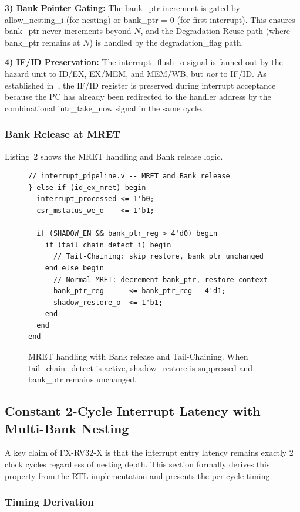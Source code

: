 \documentclass[letterpaper,journal]{IEEEtran}
\begin{document}
\textbf{3) Bank Pointer Gating:} The bank\_ptr increment is gated by allow\_nesting\_i (for nesting) or bank\_ptr = 0 (for first interrupt). This ensures bank\_ptr never increments beyond $N$, and the Degradation Reuse path (where bank\_ptr remains at $N$) is handled by the degradation\_flag path.

\textbf{4) IF/ID Preservation:} The interrupt\_flush\_o signal is fanned out by the hazard unit to ID/EX, EX/MEM, and MEM/WB, but \emph{not} to IF/ID. As established in~\cite{ref1}, the IF/ID register is preserved during interrupt acceptance because the PC has already been redirected to the handler address by the combinational intr\_take\_now signal in the same cycle.

\subsubsection{Bank Release at MRET}

Listing~2 shows the MRET handling and Bank release logic.

\begin{figure}[!t]
\centering
\begin{verbatim}
// interrupt_pipeline.v -- MRET and Bank release
} else if (id_ex_mret) begin
  interrupt_processed <= 1'b0;
  csr_mstatus_we_o    <= 1'b1;

  if (SHADOW_EN && bank_ptr_reg > 4'd0) begin
    if (tail_chain_detect_i) begin
      // Tail-Chaining: skip restore, bank_ptr unchanged
    end else begin
      // Normal MRET: decrement bank_ptr, restore context
      bank_ptr_reg      <= bank_ptr_reg - 4'd1;
      shadow_restore_o  <= 1'b1;
    end
  end
end
\end{verbatim}
\caption{MRET handling with Bank release and Tail-Chaining. When tail\_chain\_detect is active, shadow\_restore is suppressed and bank\_ptr remains unchanged.}
\label{fig:rtl_mret}
\end{figure}

\subsection{Constant 2-Cycle Interrupt Latency with Multi-Bank Nesting}

A key claim of FX-RV32-X is that the interrupt entry latency remains exactly 2 clock cycles regardless of nesting depth.
This section formally derives this property from the RTL implementation and presents the per-cycle timing.

\subsubsection{Timing Derivation}
\end{document}
